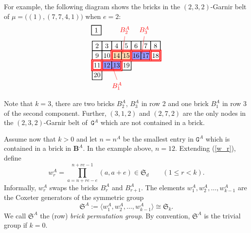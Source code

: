 \documentclass[twoside,11pt,reqno]{amsart}
\numberwithin{equation}{section}
\theoremstyle{definition}  %
\newcommand{\0}{{\bar 0}}
\newcommand{\1}{{\bar 1}}
\def\Si{\mathfrak{S}}
\def\Belt{\mathbf{B}}
\def\G{{\mathtt G}}
\newcommand\Tableau[2][\relax]{
  \begin{tikzpicture}[scale=0.5,draw/.append style={thick,black}]
    \ifx\relax#1\relax%
    \else %
      \foreach\box in {#1} { \filldraw[blue!30]\box+(-.5,-.5)rectangle++(.5,.5); }
    \fi
    \newcount\row\newcount\col
    \row=0
    \foreach \Row in {#2} {
       \col=1
       \foreach\k in \Row {
          \draw(\the\col,\the\row)+(-.5,-.5)rectangle++(.5,.5);
          \draw(\the\col,\the\row)node{\k};
          \global\advance\col by 1
       }
       \global\advance\row by -1
    }
  \end{tikzpicture}
}
\begin{document}
For example, the following diagram shows the bricks in the $(2,3,2)$-Garnir belt of
$\mu=\big((1),(7,7,4,1)\big)$ when $e=2$: 
$$\begin{array}{l}
\Tableau{{1}}\\[-20pt]
\begin{tikzpicture}[scale=0.5,draw/.append style={thick,black}]
  \fill[orange!30](2.5,-1.5)rectangle(4.5,-0.5);
  \fill[blue!40](4.5,-1.5)rectangle(6.5,-0.5);
  \fill[blue!40](1.5,-2.5)rectangle(3.5,-1.5);
  \newcount\col
  \foreach\Row/\row in {{2,3,4,5,6,7,8}/0,{9,10,14,15,16,17,18}/-1,{11,12,13,19}/-2,{20}/-3} {
     \col=1
     \foreach\k in \Row {
        \draw(\the\col,\row)+(-.5,-.5)rectangle++(.5,.5);
        \draw(\the\col,\row)node{\k};
        \global\advance\col by 1
      }
   }
   \draw[red,double,very thick](2.5,-1.5)--(2.5,-0.5)--(7.5,-0.5)--(7.5,-1.5)--(3.5,-1.5)
                     --(3.5,-2.5)--(0.5,-2.5)--(0.5,-1.5)--(2.5,-1.5);
   \draw[red,double,very thick](4.5,-0.5)--(4.5,-1.5);
   \draw[red,double,very thick](6.5,-0.5)--(6.5,-1.5);
   \draw[red,double,very thick](1.5,-1.5)--(1.5,-2.5);
   \draw[red,double,very thick](2.5,-1.5)--(3.5,-1.5);
   \draw[red,thin,->](3.85,1)node[red,above=0mm]{$B_2^A$}--(3.6,-0.8);
   \draw[red,thin,->](5.85,1)node[red,above=0mm]{$B_3^A$}--(5.6,-0.8);
   \draw[red,thin,->](3.05,-3.5)node[red,below=0mm]{$B_1^A$}--(2.6,-2.2);
\end{tikzpicture}
\end{array}$$
Note that $k=3$, there are two bricks $B_2^A$, $B_3^A$ in row 2 and one brick $B_1^A$ in row 3 of
the second component. %
Further, $(3,1,2)$ and $(2,7,2)$ are the only nodes in the $(2,3,2)$-Garnir belt of~$\G^A$ which are not contained in a brick.



Assume now that $k>0$ and let $n=n^A$ be the smallest entry in $\G^A$ which is contained in a brick in
$\Belt^A$. In the example above, $n=12$. Extending (\ref{w_r}), define
\begin{equation}\label{EWRA}
w_r^A=\prod_{a=n+re-e}^{n+re-1}(a,a+e)\in\Si_d\qquad (1\le r<k).
\end{equation}
Informally, $w_r^A$ swaps the bricks
$B_r^A$ and $B_{r+1}^A$. The elements 
$w_1^A,w_2^A,\dots,w_{k-1}^A$ are the Coxeter generators of the
symmetric group 
$$\Si^A:=\langle w_1^A,w_2^A,\dots,w_{k-1}^A\rangle\cong \Si_k.$$ 
We call $\Si^A$ the (row) {\em brick permutation group}.  By convention,
$\Si^A$ is the trivial group if $k=0$. 
\end{document}

